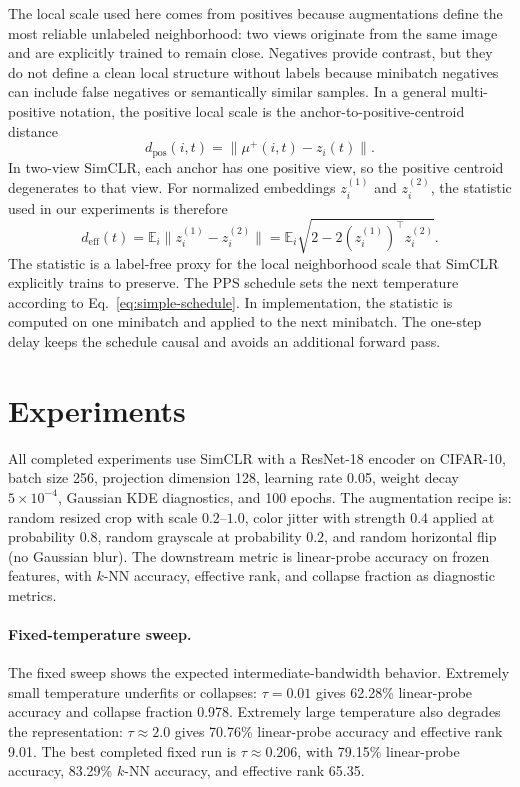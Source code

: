 \documentclass{article}
\begin{document}
The local scale used here comes from positives because augmentations define the most reliable unlabeled neighborhood: two views originate from the same image and are explicitly trained to remain close. Negatives provide contrast, but they do not define a clean local structure without labels because minibatch negatives can include false negatives or semantically similar samples. In a general multi-positive notation, the positive local scale is the anchor-to-positive-centroid distance
\begin{equation}
d_{\mathrm{pos}}(i,t)=\|\mu^+(i,t)-z_i(t)\|.
\end{equation}
In two-view SimCLR, each anchor has one positive view, so the positive centroid degenerates to that view. For normalized embeddings $z_i^{(1)}$ and $z_i^{(2)}$, the statistic used in our experiments is therefore
\begin{equation}
d_{\mathrm{eff}}(t)
=
\mathbb{E}_i\|z_i^{(1)}-z_i^{(2)}\|
=
\mathbb{E}_i\sqrt{2-2(z_i^{(1)})^\top z_i^{(2)}} .
\end{equation}
The statistic is a label-free proxy for the local neighborhood scale that SimCLR explicitly trains to preserve. The PPS schedule sets the next temperature according to Eq.~\eqref{eq:simple-schedule}. In implementation, the statistic is computed on one minibatch and applied to the next minibatch. The one-step delay keeps the schedule causal and avoids an additional forward pass.

\section{Experiments}\label{sec:experiments}

All completed experiments use SimCLR with a ResNet-18 encoder on CIFAR-10, batch size 256, projection dimension 128, learning rate 0.05, weight decay $5\times10^{-4}$, Gaussian KDE diagnostics, and 100 epochs. The augmentation recipe is: random resized crop with scale $0.2$--$1.0$, color jitter with strength $0.4$ applied at probability $0.8$, random grayscale at probability $0.2$, and random horizontal flip (no Gaussian blur). The downstream metric is linear-probe accuracy on frozen features, with $k$-NN accuracy, effective rank, and collapse fraction as diagnostic metrics.

\paragraph{Fixed-temperature sweep.}
The fixed sweep shows the expected intermediate-bandwidth behavior. Extremely small temperature underfits or collapses: $\tau=0.01$ gives 62.28\% linear-probe accuracy and collapse fraction 0.978. Extremely large temperature also degrades the representation: $\tau\approx2.0$ gives 70.76\% linear-probe accuracy and effective rank 9.01. The best completed fixed run is $\tau\approx0.206$, with 79.15\% linear-probe accuracy, 83.29\% $k$-NN accuracy, and effective rank 65.35.
\end{document}
